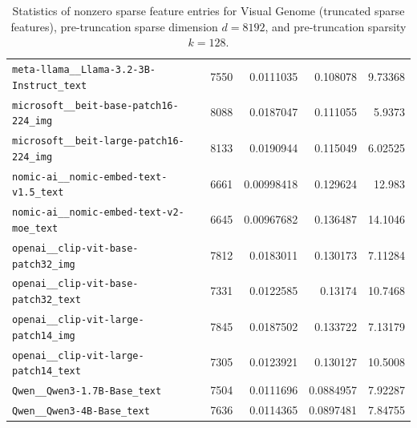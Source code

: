 \begin{table}[htbp]
{\begin{tabular}{lrrrr}
\texttt{meta-llama\_\_Llama-3.2-3B-Instruct\_text} & 7550 & 0.0111035 & 0.108078 & 9.73368 \\
\texttt{microsoft\_\_beit-base-patch16-224\_img} & 8088 & 0.0187047 & 0.111055 & 5.9373 \\
\texttt{microsoft\_\_beit-large-patch16-224\_img} & 8133 & 0.0190944 & 0.115049 & 6.02525 \\
\texttt{nomic-ai\_\_nomic-embed-text-v1.5\_text} & 6661 & 0.00998418 & 0.129624 & 12.983 \\
\texttt{nomic-ai\_\_nomic-embed-text-v2-moe\_text} & 6645 & 0.00967682 & 0.136487 & 14.1046 \\
\texttt{openai\_\_clip-vit-base-patch32\_img} & 7812 & 0.0183011 & 0.130173 & 7.11284 \\
\texttt{openai\_\_clip-vit-base-patch32\_text} & 7331 & 0.0122585 & 0.13174 & 10.7468 \\
\texttt{openai\_\_clip-vit-large-patch14\_img} & 7845 & 0.0187502 & 0.133722 & 7.13179 \\
\texttt{openai\_\_clip-vit-large-patch14\_text} & 7305 & 0.0123921 & 0.130127 & 10.5008 \\
\texttt{Qwen\_\_Qwen3-1.7B-Base\_text} & 7504 & 0.0111696 & 0.0884957 & 7.92287 \\
\texttt{Qwen\_\_Qwen3-4B-Base\_text} & 7636 & 0.0114365 & 0.0897481 & 7.84755 \\
\bottomrule
\end{tabular}
}%
\caption{Statistics of nonzero sparse feature entries for Visual Genome (truncated sparse features), pre-truncation sparse dimension $d=8192$, and pre-truncation sparsity $k=128$.}
\label{tab:sparse-feature-entries-visual-genome-truncated-d8192-k128}
\end{table}
